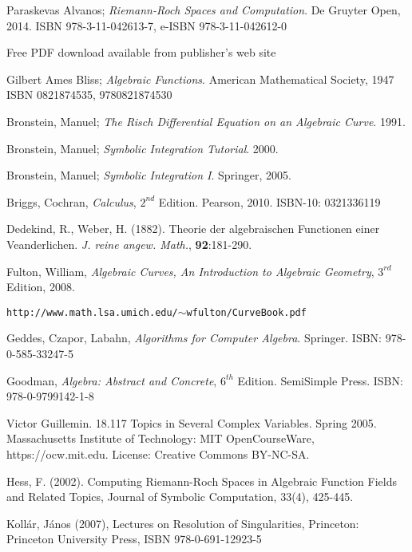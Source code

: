

\begin{thebibliography}{9}

Paraskevas Alvanos;
{\it Riemann-Roch Spaces and Computation}.
De Gruyter Open, 2014.
ISBN 978-3-11-042613-7, e-ISBN 978-3-11-042612-0

Free PDF download available from publisher's web site

Gilbert Ames Bliss; {\it Algebraic Functions}. American Mathematical Society, 1947
ISBN 0821874535, 9780821874530

Bronstein, Manuel; {\it The Risch Differential Equation on an Algebraic Curve}. 1991.

Bronstein, Manuel; {\it Symbolic Integration Tutorial}. 2000.

Bronstein, Manuel; {\it Symbolic Integration I}. Springer, 2005.

Briggs, Cochran, {\it Calculus}, $2^{nd}$ Edition.  Pearson, 2010.  ISBN-10: 0321336119

Dedekind, R., Weber, H. (1882). Theorie der algebraischen Functionen einer Veanderlichen.
{\it J. reine angew. Math.}, {\bf 92}:181-290.

Fulton, William, {\it Algebraic Curves, An Introduction to Algebraic Geometry}, $3^{rd}$ Edition, 2008.

{\tt http://www.math.lsa.umich.edu/$\sim$wfulton/CurveBook.pdf}

Geddes, Czapor, Labahn, {\it Algorithms for Computer Algebra}. Springer.
ISBN: 978-0-585-33247-5

Goodman, {\it Algebra: Abstract and Concrete}, $6^{th}$ Edition.  SemiSimple Press.
ISBN: 978-0-9799142-1-8

Victor Guillemin. 18.117 Topics in Several Complex Variables. Spring 2005. Massachusetts Institute of Technology: MIT OpenCourseWare, https://ocw.mit.edu. License: Creative Commons BY-NC-SA.

Hess, F. (2002). Computing Riemann-Roch Spaces in Algebraic Function Fields and Related Topics,
Journal of Symbolic Computation, 33(4), 425-445.

Kollár, János (2007), Lectures on Resolution of Singularities, Princeton: Princeton University Press, ISBN 978-0-691-12923-5


\end{thebibliography}
